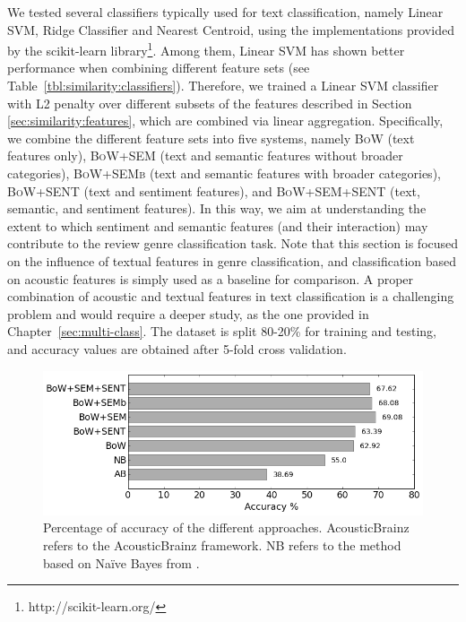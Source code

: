 We tested several classifiers typically used for text classification, namely Linear SVM, Ridge Classifier and Nearest Centroid, using the implementations provided by the scikit-learn library\footnote{http://scikit-learn.org/}. Among them, Linear SVM has shown better performance when combining different feature sets (see Table~\ref{tbl:similarity:classifiers}). Therefore, we trained a Linear SVM classifier with L2 penalty over different subsets of the features described in Section \ref{sec:similarity:features}, which are combined via linear aggregation. Specifically, we combine the different feature sets into five systems, namely \textsc{BoW} (text features only), \textsc{BoW+SEM} (text and semantic features without broader categories), \textsc{BoW+SEMb} (text and semantic features with broader categories), \textsc{BoW+SENT} (text and sentiment features), and \textsc{BoW+SEM+SENT} (text, semantic, and sentiment features). In this way, we aim at understanding the extent to which sentiment and semantic features (and their interaction) may contribute to the review genre classification task. Note that this section is focused on the influence of textual features in genre classification, and classification based on acoustic features is simply used as a baseline for comparison. A proper combination of acoustic and textual features in text classification is a challenging problem and would require a deeper study, as the one provided in Chapter~\ref{sec:multi-class}.
The dataset is split 80-20\% for training and testing, and accuracy values are obtained after 5-fold cross validation. 

\begin{figure}
    \centering
    \includegraphics[width=0.8\columnwidth]{ch06_similarity_pics/results2_bn.png}
    \caption[Percentage of accuracy of the different approaches.]{Percentage of accuracy of the different approaches. AcousticBrainz refers to the AcousticBrainz framework. NB refers to the method based on Na\"{i}ve Bayes from \cite{Hu2005}.}
    \label{fig:similarity:results}
\end{figure}

